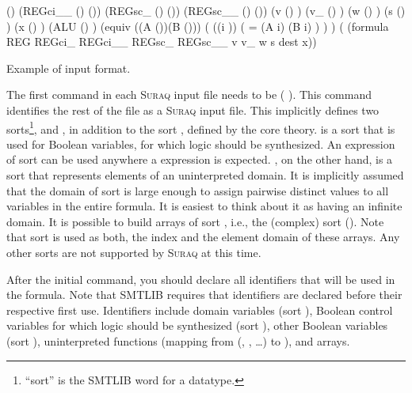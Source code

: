 \documentclass[a4paper]{article}
\newcommand\suraq{\mbox{\textsc{Suraq}}\xspace}
\begin{document}
\begin{algorithm}
\DontPrintSemicolon
  (\setLogic \suraqlogic)\;
  \BlankLine
  [...]
  \BlankLine
  (\declareFun REGci\_\_ () (\Array \Value \Value))\;
  (\declareFun REGsc\_  ()  (\Array \Value \Value))\;
  (\declareFun REGsc\_\_ () (\Array \Value \Value))\;
\BlankLine
  (\declareFun v    () \Value)\;
  (\declareFun v\_  () \Value)\;
  (\declareFun w    () \Value)\;
  (\declareFun s    () \Value)\;
\BlankLine
  (\declareFun x () \Control)\;
\BlankLine
  (\declareFun ALU (\Value) \Value)\;
\BlankLine
  ( equiv \;\Indp
  ((A (\Array \Value \Value))(B (\Array \Value \Value)))\;
  \Bool (\;\Indp
    \smtforall ((i \Value)) (\;\Indp
      = (\select A i)\; \Indp
        (\select B i)\;\Indm
 \Indm      )\;
 \Indm    )\;
 \Indm  )\;
  \BlankLine
  [...]
  \BlankLine
  (\assert \;\Indp
  (formula REG REGci\_  REGci\_\_  REGsc\_  REGsc\_\_  v v\_  w s dest
  x))\;\Indm
  \caption{Example of input format.} \label{list:first_example}
\end{algorithm}


The first command in each \suraq input file needs to be (\setLogic
\suraqlogic). This command identifies the rest of the file as a
\suraq input file. This implicitly defines two sorts\footnote{
``sort'' is the SMTLIB word for a datatype.}, \Control and \Value, in
addition to the sort \Bool, defined by the core theory. \Control is a
sort that is used for Boolean variables, for which logic should be
synthesized. An expression of sort \Control can be used anywhere a
\Bool expression is expected. \Value, on the other hand, is a sort
that represents elements of an uninterpreted domain. It is implicitly
assumed that the domain of sort \Value is large enough to assign
pairwise distinct values to all variables in the entire formula. It
is easiest to think about it as having an infinite domain.
%
It is possible to build arrays of sort \Value, i.e., the (complex)
sort (\Array \Value \Value). Note that sort \Value is used as both,
the index and the element domain of these arrays. Any other sorts are
not supported by \suraq at this time.

After the initial \setLogic command, you should declare all
identifiers that will be used in the formula. Note that SMTLIB
requires that identifiers are declared before their respective first
use. Identifiers include domain variables (sort \Value), Boolean
control variables for which logic should be synthesized (sort
\Control), other Boolean variables (sort \Bool), uninterpreted
functions (mapping from (\Value, \Value, \ldots) to \Value), and
arrays.


\end{document}
